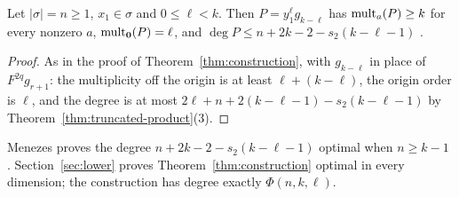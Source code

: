 \begin{proposition}\label{prop:menezes-polynomial}
Let \(|\sigma|=n\ge1\), \(x_1\in\sigma\) and \(0\le\ell<k\). Then
\(P=y_1^\ell g_{k-\ell}\) has \(\operatorname{mult}_a(P)\ge k\) for every nonzero \(a\),
\(\operatorname{mult}_{\mathbf 0}(P)=\ell\), and \(\deg P\le n+2k-2-s_2(k-\ell-1)\)
.
\end{proposition}

\begin{proof}
As in the proof of Theorem~\ref{thm:construction}, with \(g_{k-\ell}\) in place of
\(F^{2q}g_{r+1}\): the multiplicity off the origin is at least \(\ell+(k-\ell)\),
the origin order is \(\ell\), and the degree is at most
\(2\ell+n+2(k-\ell-1)-s_2(k-\ell-1)\) by Theorem~\ref{thm:truncated-product}(3).
\end{proof}

Menezes proves the degree \(n+2k-2-s_2(k-\ell-1)\) optimal when \(n\ge k-1\)
\cite[Corollary~1.3]{Men26}. Section~\ref{sec:lower} proves
Theorem~\ref{thm:construction} optimal in every dimension; the construction has
degree exactly \(\Phi(n,k,\ell)\).
